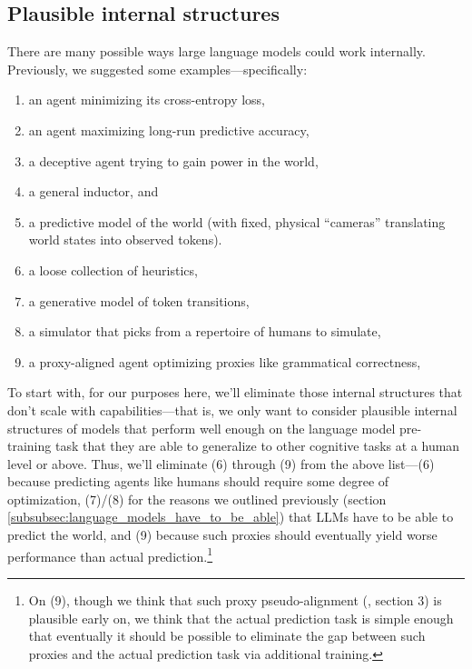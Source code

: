 \documentclass[
  twocolumn,
  natbib,
]{miri-tech-article}
\begin{document}
\subsection{Plausible internal structures}

There are many possible ways large language models could work internally. Previously, we suggested some examples---specifically:



\begin{enumerate}
\item an agent minimizing its cross-entropy loss,
\item an agent maximizing long-run predictive accuracy,
\item a deceptive agent trying to gain power in the world,
\item a general inductor, and
\item a predictive model of the world (with fixed, physical ``cameras'' translating world states into observed tokens).
\item a loose collection of heuristics,
\item a generative model of token transitions,
\item a simulator that picks from a repertoire of humans to simulate,
\item a proxy-aligned agent optimizing proxies like grammatical correctness,
\end{enumerate}

To start with, for our purposes here, we'll eliminate those internal structures that don't scale with capabilities---that is, we only want to consider plausible internal structures of models that perform well enough on the language model pre-training task that they are able to generalize to other cognitive tasks at a human level or above. Thus, we'll eliminate (6) through (9)  from the above list---(6) because predicting agents like humans should require some degree of optimization, (7)/(8) for the reasons we outlined previously (section \ref{subsubsec:language_models_have_to_be_able}) that LLMs have to be able to predict the world, and (9) because such proxies should eventually yield worse performance than actual prediction.\footnote{On (9), though we think that such proxy pseudo-alignment (\cite{risks}, section 3) is plausible early on, we think that the actual prediction task is simple enough that eventually it should be possible to eliminate the gap between such proxies and the actual prediction task via additional training.}
\end{document}
